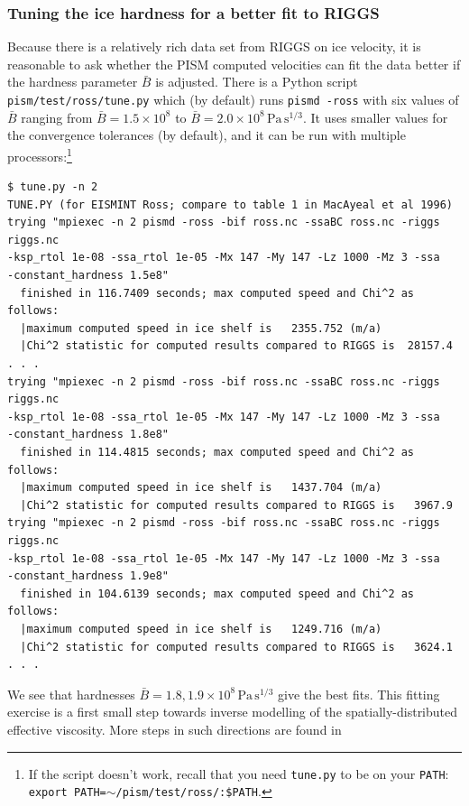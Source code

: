 \documentclass[11pt,final]{amsart}
\begin{document}
\subsubsection*{Tuning the ice hardness for a better fit to RIGGS}  Because there is a relatively rich data set from RIGGS on ice velocity, it is reasonable to ask whether the PISM computed velocities can fit the data better if the hardness parameter $\bar B$ is adjusted.  There is a Python script \verb|pism/test/ross/tune.py| which (by default) runs \verb|pismd -ross| with six values of $\bar B$ ranging from $\bar B = 1.5  \times 10^8$ to $\bar B = 2.0 \times 10^8 \, \text{Pa}\, \text{s}^{1/3}$.  It uses smaller values for the convergence tolerances (by default), and it can be run with multiple processors:\footnote{If the script doesn't work, recall that you need \texttt{tune.py} to be on your \texttt{PATH}: \texttt{export PATH=$\sim$/pism/test/ross/:\$PATH}.}

\small\begin{verbatim}
$ tune.py -n 2
TUNE.PY (for EISMINT Ross; compare to table 1 in MacAyeal et al 1996)
trying "mpiexec -n 2 pismd -ross -bif ross.nc -ssaBC ross.nc -riggs riggs.nc
-ksp_rtol 1e-08 -ssa_rtol 1e-05 -Mx 147 -My 147 -Lz 1000 -Mz 3 -ssa
-constant_hardness 1.5e8"
  finished in 116.7409 seconds; max computed speed and Chi^2 as follows:
  |maximum computed speed in ice shelf is   2355.752 (m/a)
  |Chi^2 statistic for computed results compared to RIGGS is  28157.4
. . .
trying "mpiexec -n 2 pismd -ross -bif ross.nc -ssaBC ross.nc -riggs riggs.nc
-ksp_rtol 1e-08 -ssa_rtol 1e-05 -Mx 147 -My 147 -Lz 1000 -Mz 3 -ssa
-constant_hardness 1.8e8"
  finished in 114.4815 seconds; max computed speed and Chi^2 as follows:
  |maximum computed speed in ice shelf is   1437.704 (m/a)
  |Chi^2 statistic for computed results compared to RIGGS is   3967.9
trying "mpiexec -n 2 pismd -ross -bif ross.nc -ssaBC ross.nc -riggs riggs.nc
-ksp_rtol 1e-08 -ssa_rtol 1e-05 -Mx 147 -My 147 -Lz 1000 -Mz 3 -ssa
-constant_hardness 1.9e8"
  finished in 104.6139 seconds; max computed speed and Chi^2 as follows:
  |maximum computed speed in ice shelf is   1249.716 (m/a)
  |Chi^2 statistic for computed results compared to RIGGS is   3624.1
. . .
\end{verbatim}
\normalsize

We see that hardnesses $\bar B = 1.8,1.9 \times 10^8 \, \text{Pa}\, \text{s}^{1/3}$ give the best fits.  This fitting exercise is a first small step towards inverse modelling of the spatially-distributed effective viscosity.  More steps in such directions are found in \cite{HumbertGreveHutter,RommelaereMacAyeal}
\end{document}
